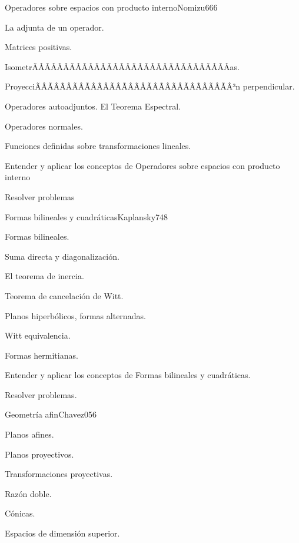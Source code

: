 \begin{sumilla}
\begin{unit}{Operadores sobre espacios con producto interno}{Nomizu66}{6}
   \begin{topicos}
	\item  La adjunta de un operador.
	\item  Matrices positivas.
	\item  IsometrÃÂÃÂÃÂÃÂÃÂÃÂÃÂÃÂÃÂÃÂÃÂÃÂÃÂÃÂÃÂÃÂ­as.
	\item  ProyecciÃÂÃÂÃÂÃÂÃÂÃÂÃÂÃÂÃÂÃÂÃÂÃÂÃÂÃÂÃÂÃÂ³n perpendicular.
	\item  Operadores autoadjuntos. El Teorema Espectral.
	\item  Operadores normales.
	\item Funciones definidas sobre transformaciones lineales.
   \end{topicos}

   \begin{objetivos}
         \item  Entender y aplicar los conceptos de Operadores sobre espacios con producto interno
         \item  Resolver problemas
   \end{objetivos}
\end{unit}

\begin{unit}{Formas bilineales y cuadr\'aticas}{Kaplansky74}{8}
   \begin{topicos}
	\item Formas bilineales.
	\item Suma directa y diagonalizaci\'on.
	\item El teorema de inercia.
	\item Teorema de cancelaci\'on de Witt.
	\item Planos hiperb\'olicos, formas alternadas.
	\item Witt equivalencia.
	\item Formas hermitianas.
   \end{topicos}

   \begin{objetivos}
         \item Entender y aplicar los conceptos de Formas bilineales y cuadr\'aticas.
         \item Resolver problemas.
   \end{objetivos}
\end{unit}

\begin{unit}{Geometr\'ia afin}{Chavez05}{6}
   \begin{topicos}
         \item  Planos afines.
	 \item  Planos proyectivos.
         \item  Transformaciones proyectivas.
	 \item  Raz\'on doble.
         \item  C\'onicas.
         \item  Espacios de dimensi\'on superior.
   \end{topicos}


\end{unit}
\end{sumilla}
